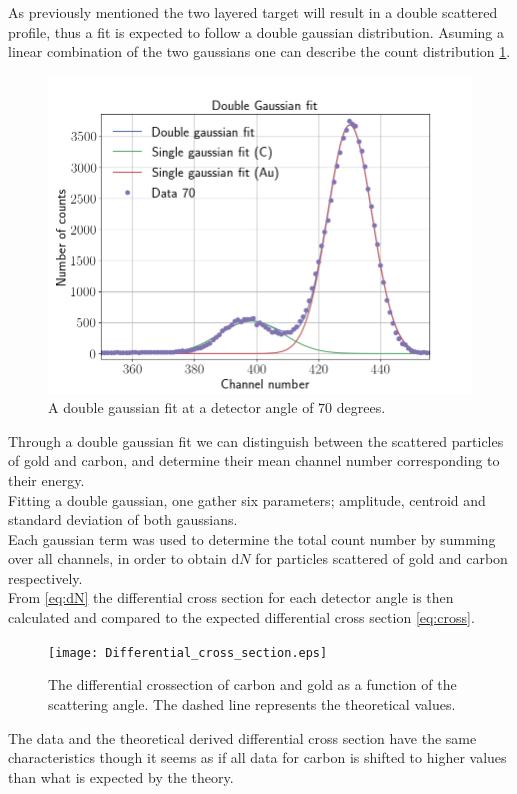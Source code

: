 As previously mentioned  the two layered target will result in a double
scattered profile, thus a fit is expected to follow a double gaussian
distribution. Asuming a linear combination of the two gaussians one can
describe the count distribution \cref{fig_doublegauss}.\\
\begin{figure}[h]
\centering
\includegraphics[width=0.99\columnwidth]{Data_70}
\caption{A double gaussian fit at a detector angle of $70$ degrees.}
\label{fig_doublegauss}
\end{figure}
Through a double gaussian fit we can distinguish between the scattered particles of gold and carbon, and determine their mean channel number corresponding to their energy.  \\
Fitting a double gaussian, one gather six parameters; amplitude, centroid and standard deviation
of both gaussians.  \\
Each gaussian term was used to determine the total count number by summing over
all channels, in order to obtain $\mathrm{d}N$ for particles scattered of gold
and carbon respectively.\\
%
From \cref{eq:dN} the differential cross section for each detector angle is
then calculated and compared to the expected differential cross section
\cref{eq:cross}.\\
\begin{figure}[h]
	\centering
		\texttt{[image: Differential\_cross\_section.eps]}
	\caption{The differential crossection  of carbon and gold as a function of the scattering angle. The dashed line represents the theoretical values.}
	\label{fig:Differential_cross_section}
\end{figure}
The data and the theoretical derived differential cross section have the same
characteristics though it seems as if all data for carbon is shifted to higher
values than what is expected by the theory.

